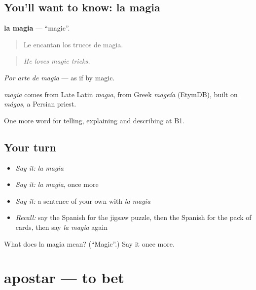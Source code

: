\subsection*{You'll want to know: la magia}
\textbf{la magia} — \textquotedblleft{}magic\textquotedblright{}.

\begin{quote}
Le encantan los trucos de magia.
\end{quote}

\begin{quote}
\emph{He loves magic tricks.}
\end{quote}

\emph{Por arte de magia} — as if by magic.

\begin{cousinweb}
\emph{magia} comes from Late Latin \emph{magīa}, from Greek \emph{mageía} (EtymDB), built on \emph{mágos}, a Persian priest.
\end{cousinweb}

\begin{grammarlens}[title={What you've built}]
One more word for telling, explaining and describing at B1.
\end{grammarlens}

\subsection*{Your turn}
\begin{itemize}
\raggedright
  \item \emph{Say it:} \emph{la magia}
  \item \emph{Say it:} \emph{la magia}, once more
  \item \emph{Say it:} a sentence of your own with \emph{la magia}
  \item \emph{Recall:} say the Spanish for the jigsaw puzzle, then the Spanish for the pack of cards, then say \emph{la magia} again
\end{itemize}

\begin{tcolorbox}[breakable,colback=teal!4,colframe=teal!35!black,title={Before you move on}]
What does la magia mean? (\textquotedblleft{}Magic\textquotedblright{}.) Say it once more.
\end{tcolorbox}
\section[apostar]{apostar — to bet}

\label{lesson:ES-C752-apostar}



